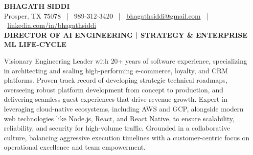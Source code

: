 \documentclass[9pt, letterpaper]{extarticle}
\begin{document}
\begin{center}
    {\huge \textbf{BHAGATH SIDDI}} \\
    \vspace{2pt}
    \small Prosper, TX 75078 \ | \ 989-312-3420 \ | \ \href{mailto:bhagathsiddi@gmail.com}{bhagathsiddi@gmail.com} \ | \ \href{https://www.linkedin.com/in/bhagathsiddi}{linkedin.com/in/bhagathsiddi} \\
    \vspace{4pt} 
    \textbf{\large DIRECTOR OF AI ENGINEERING | STRATEGY \& ENTERPRISE ML LIFE-CYCLE}
\end{center}

\vspace{-4pt}
{
\small \centering
Visionary Engineering Leader with 20+ years of software experience, specializing in architecting and scaling high-performing e-commerce, loyalty, and CRM platforms. Proven track record of developing strategic technical roadmaps, overseeing robust platform development from concept to production, and delivering seamless guest experiences that drive revenue growth. Expert in leveraging cloud-native ecosystems, including AWS and GCP, alongside modern web technologies like Node.js, React, and React Native, to ensure scalability, reliability, and security for high-volume traffic. Grounded in a collaborative culture, balancing aggressive execution timelines with a customer-centric focus on operational excellence and team empowerment.
\par}

\vspace{-4pt}

\end{document}
